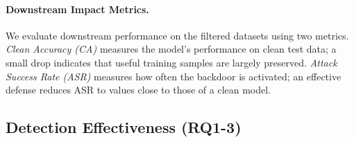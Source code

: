 \documentclass[letterpaper,twocolumn,10pt]{article}
\begin{document}
\paragraph{Downstream Impact Metrics.}
We evaluate downstream performance on the filtered datasets using two metrics. 
\textit{Clean Accuracy (CA)} measures the model's performance on clean test data; 
a small drop indicates that useful training samples are largely preserved. 
\textit{Attack Success Rate (ASR)} measures how often the backdoor is activated; 
an effective defense reduces ASR to values close to those of a clean model.


\subsection{Detection Effectiveness (RQ1-3)}
\label{exp_result}
\end{document}
